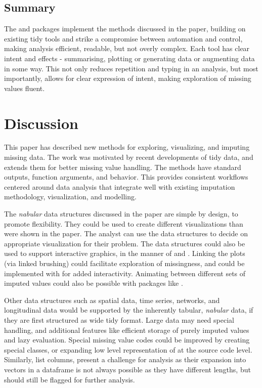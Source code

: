 \documentclass[
]{jss}
\begin{document}
\hypertarget{case-study-summary}{%
\subsection{Summary}\label{case-study-summary}}

The  and  packages implement the methods discussed in the paper, building on existing tidy tools and strike a compromise between automation and control, making analysis efficient, readable, but not overly complex. Each tool has clear intent and effects - summarising, plotting or generating data or augmenting data in some way. This not only reduces repetition and typing in an analysis, but most importantly, allows for clear expression of intent, making exploration of missing values fluent.

\hypertarget{discussion}{%
\section{Discussion}\label{discussion}}

This paper has described new methods for exploring, visualizing, and imputing missing data. The work was motivated by recent developments of tidy data, and extends them for better missing value handling. The methods have standard outputs, function arguments, and behavior. This provides consistent workflows centered around data analysis that integrate well with existing imputation methodology, visualization, and modelling.

The \emph{nabular} data structures discussed in the paper are simple by design, to promote flexibility. They could be used to create different visualizations than were shown in the paper. The analyst can use the data structures to decide on appropriate visualization for their problem. The data structures could also be used to support interactive graphics, in the manner of  and . Linking the plots (via linked brushing) could facilitate exploration of missingness, and could be implemented with  \citep{plotly} for added interactivity. Animating between different sets of imputed values could also be possible with packages like  \citep{gganimate}.

Other data structures such as spatial data, time series, networks, and longitudinal data would be supported by the inherently tabular, \emph{nabular} data, if they are first structured as wide tidy format. Large data may need special handling, and additional features like efficient storage of purely imputed values and lazy evaluation. Special missing value codes could be improved by creating special classes, or expanding low level representation of  at the source code level. Similarly, list columns, present a challenge for analysis as their expansion into vectors in a dataframe is not always possible as they have different lengths, but should still be flagged for further analysis.
\end{document}
